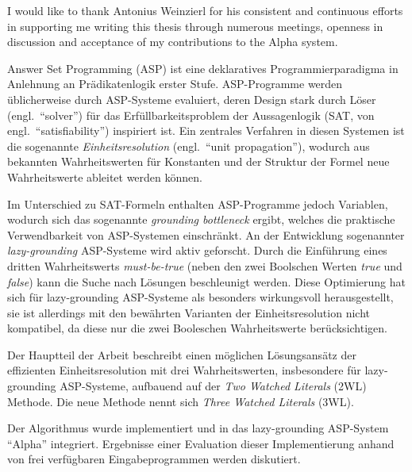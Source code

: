 \documentclass{vutinfth} %
\newcommand{\mbt}{must-be-true\xspace}
\begin{document}
\frontmatter %

\addstatementpage


\begin{acknowledgements*}
I would like to thank Antonius Weinzierl for his consistent and continuous efforts in supporting me writing this thesis through numerous meetings, openness in discussion and acceptance of my contributions to the Alpha system.
\end{acknowledgements*}


\begin{kurzfassung}
Answer Set Programming (ASP) ist eine deklaratives Programmierparadigma in Anlehnung an Prädikatenlogik erster Stufe. ASP-Programme werden üblicherweise durch ASP-Systeme evaluiert, deren Design stark durch Löser (engl.~\enquote{solver}) für das Erfüllbarkeitsproblem der Aussagenlogik (SAT, von engl.~\enquote{satisfiability}) inspiriert ist. Ein zentrales Verfahren in diesen Systemen ist die sogenannte \emph{Einheitsresolution} (engl.~\enquote{unit propagation}), wodurch aus bekannten Wahrheitswerten für Konstanten und der Struktur der Formel neue Wahrheitswerte ableitet werden können.

Im Unterschied zu SAT-Formeln enthalten ASP-Programme jedoch Variablen, wodurch sich das sogenannte \emph{grounding bottleneck} ergibt, welches die praktische Verwendbarkeit von ASP-Systemen einschränkt. An der Entwicklung sogenannter \emph{lazy-grounding} ASP-Systeme wird aktiv geforscht. Durch die Einführung eines dritten Wahrheitswerts \emph{\mbt} (neben den zwei Boolschen Werten \emph{true} und \emph{false}) kann die Suche nach Lösungen beschleunigt werden. Diese Optimierung hat sich für lazy-grounding ASP-Systeme als besonders wirkungsvoll herausgestellt, sie ist allerdings mit den bewährten Varianten der Einheitsresolution nicht kompatibel, da diese nur die zwei Booleschen Wahrheitswerte berücksichtigen.

Der Hauptteil der Arbeit beschreibt einen möglichen Lösungsansätz der effizienten Einheitsresolution mit drei Wahrheitswerten, insbesondere für lazy-grounding ASP-Systeme, aufbauend auf der \emph{Two Watched Literals} (2WL) Methode. Die neue Methode nennt sich \emph{Three Watched Literals} (3WL).

Der Algorithmus wurde implementiert und in das lazy-grounding ASP-System \enquote{Alpha} integriert. Ergebnisse einer Evaluation dieser Implementierung anhand von frei verfügbaren Eingabeprogrammen werden diskutiert.
\end{kurzfassung}
\end{document}
